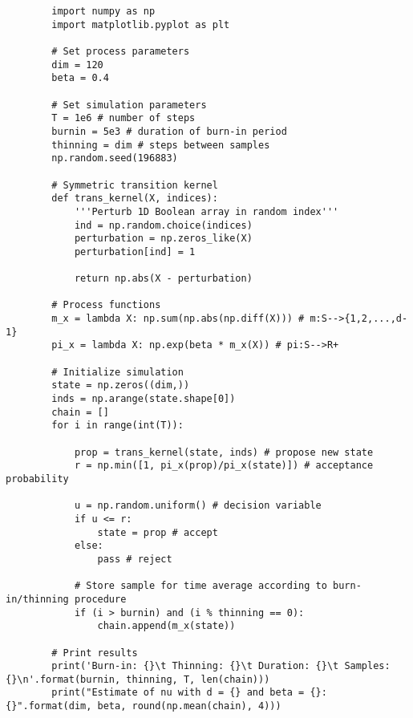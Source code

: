 \documentclass[11pt, letterpaper]{article}
\begin{document}
    \begin{verbatim}
        import numpy as np
        import matplotlib.pyplot as plt

        # Set process parameters
        dim = 120
        beta = 0.4

        # Set simulation parameters
        T = 1e6 # number of steps
        burnin = 5e3 # duration of burn-in period
        thinning = dim # steps between samples
        np.random.seed(196883) 

        # Symmetric transition kernel
        def trans_kernel(X, indices):
            '''Perturb 1D Boolean array in random index'''
            ind = np.random.choice(indices)
            perturbation = np.zeros_like(X)
            perturbation[ind] = 1

            return np.abs(X - perturbation)

        # Process functions
        m_x = lambda X: np.sum(np.abs(np.diff(X))) # m:S-->{1,2,...,d-1}
        pi_x = lambda X: np.exp(beta * m_x(X)) # pi:S-->R+

        # Initialize simulation
        state = np.zeros((dim,))
        inds = np.arange(state.shape[0])
        chain = []
        for i in range(int(T)):

            prop = trans_kernel(state, inds) # propose new state
            r = np.min([1, pi_x(prop)/pi_x(state)]) # acceptance probability

            u = np.random.uniform() # decision variable
            if u <= r:
                state = prop # accept
            else:
                pass # reject

            # Store sample for time average according to burn-in/thinning procedure
            if (i > burnin) and (i % thinning == 0):
                chain.append(m_x(state))

        # Print results
        print('Burn-in: {}\t Thinning: {}\t Duration: {}\t Samples: {}\n'.format(burnin, thinning, T, len(chain)))
        print("Estimate of nu with d = {} and beta = {}: {}".format(dim, beta, round(np.mean(chain), 4)))
    \end{verbatim}
\end{document}
